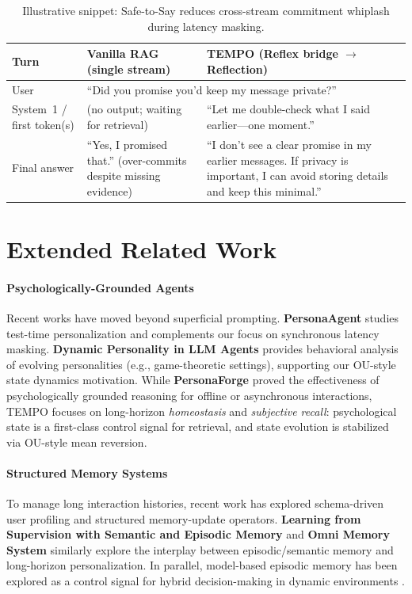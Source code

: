 \documentclass[11pt]{article}
\begin{document}
\begin{table}[t]
  \caption{Illustrative snippet: Safe-to-Say reduces cross-stream commitment whiplash during latency masking.}
  \label{tab:qualitative-snippet-main}
  \centering
  \small
  \setlength{\tabcolsep}{4pt}
  \begin{tabular}{p{}p{}p{}}
    \toprule
    Turn & Vanilla RAG (single stream) & TEMPO (Reflex bridge $\rightarrow$ Reflection) \\
    \midrule
    User & \multicolumn{2}{p{0.82\textwidth}}{``Did you promise you'd keep my message private?''} \\
    \addlinespace
    System~1 / first token(s) & (no output; waiting for retrieval) & ``Let me double-check what I said earlier---one moment.'' \\
    \addlinespace
    Final answer & ``Yes, I promised that.'' (over-commits despite missing evidence) & ``I don't see a clear promise in my earlier messages. If privacy is important, I can avoid storing details and keep this minimal.'' \\
    \bottomrule
  \end{tabular}
\end{table}

\section{Extended Related Work}
\label{app:extended-related-work}

\paragraph{Psychologically-Grounded Agents}
Recent works have moved beyond superficial prompting. \textbf{PersonaAgent} \cite{zhang2025personaagent} studies test-time personalization and complements our focus on synchronous latency masking. \textbf{Dynamic Personality in LLM Agents} \cite{zeng2025dynamicpersonality} provides behavioral analysis of evolving personalities (e.g., game-theoretic settings), supporting our OU-style state dynamics motivation.
While \textbf{PersonaForge} proved the effectiveness of psychologically grounded reasoning for offline or asynchronous interactions, TEMPO focuses on long-horizon \emph{homeostasis} and \emph{subjective recall}: psychological state is a first-class control signal for retrieval, and state evolution is stabilized via OU-style mean reversion.

\paragraph{Structured Memory Systems}
To manage long interaction histories, recent work has explored schema-driven user profiling and structured memory-update operators. \textbf{Learning from Supervision with Semantic and Episodic Memory} \cite{hassell2025reflective} and \textbf{Omni Memory System} \cite{wang2025omnimemory} similarly explore the interplay between episodic/semantic memory and long-horizon personalization. In parallel, model-based episodic memory has been explored as a control signal for hybrid decision-making in dynamic environments \cite{le2021modelbasedepisodic}.
\end{document}

